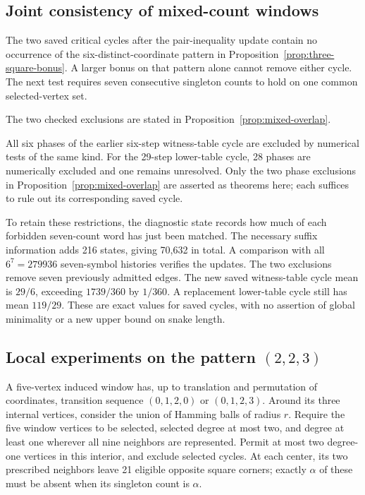 \documentclass[11pt,a4paper]{article}
\theoremstyle{definition}
\theoremstyle{remark}
\begin{document}
\subsection{Joint consistency of mixed-count windows}
The two saved critical cycles after the pair-inequality update contain no occurrence of the six-distinct-coordinate pattern in Proposition~\ref{prop:three-square-bonus}. A larger bonus on that pattern alone cannot remove either cycle. The next test requires seven consecutive singleton counts to hold on one common selected-vertex set.

The two checked exclusions are stated in Proposition~\ref{prop:mixed-overlap}.

All six phases of the earlier six-step witness-table cycle are excluded by numerical tests of the same kind. For the 29-step lower-table cycle, 28 phases are numerically excluded and one remains unresolved. Only the two phase exclusions in Proposition~\ref{prop:mixed-overlap} are asserted as theorems here; each suffices to rule out its corresponding saved cycle.

To retain these restrictions, the diagnostic state records how much of each forbidden seven-count word has just been matched. The necessary suffix information adds 216 states, giving 70,632 in total. A comparison with all $6^7=279936$ seven-symbol histories verifies the updates. The two exclusions remove seven previously admitted edges. The new saved witness-table cycle mean is $29/6$, exceeding $1739/360$ by $1/360$. A replacement lower-table cycle still has mean $119/29$. These are exact values for saved cycles, with no assertion of global minimality or a new upper bound on snake length.

\subsection{Local experiments on the pattern $(2,2,3)$}
A five-vertex induced window has, up to translation and permutation of coordinates, transition sequence $(0,1,2,0)$ or $(0,1,2,3)$. Around its three internal vertices, consider the union of Hamming balls of radius $r$. Require the five window vertices to be selected, selected degree at most two, and degree at least one wherever all nine neighbors are represented. Permit at most two degree-one vertices in this interior, and exclude selected cycles. At each center, its two prescribed neighbors leave 21 eligible opposite square corners; exactly $\alpha$ of these must be absent when its singleton count is $\alpha$.
\end{document}
